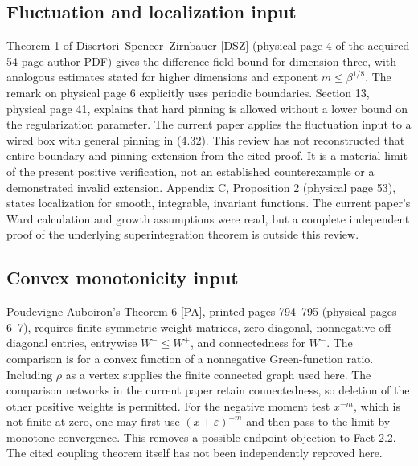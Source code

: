 \documentclass[10pt]{article}
\begin{document}
\subsection*{Fluctuation and localization input}
Theorem 1 of Disertori–Spencer–Zirnbauer [DSZ] (physical page 4 of the acquired 54-page author PDF) gives the difference-field bound for dimension three, with analogous estimates stated for higher dimensions and exponent \(m\leq\beta^{1/8}\). The remark on physical page 6 explicitly uses periodic boundaries. Section 13, physical page 41, explains that hard pinning is allowed without a lower bound on the regularization parameter. The current paper applies the fluctuation input to a wired box with general pinning in (4.32). This review has not reconstructed that entire boundary and pinning extension from the cited proof. It is a material limit of the present positive verification, not an established counterexample or a demonstrated invalid extension. Appendix C, Proposition 2 (physical page 53), states localization for smooth, integrable, invariant functions. The current paper’s Ward calculation and growth assumptions were read, but a complete independent proof of the underlying superintegration theorem is outside this review.\par
\subsection*{Convex monotonicity input}
Poudevigne-Auboiron’s Theorem 6 [PA], printed pages 794–795 (physical pages 6–7), requires finite symmetric weight matrices, zero diagonal, nonnegative off-diagonal entries, entrywise \(W^-\leq W^+\), and connectedness for \(W^-\). The comparison is for a convex function of a nonnegative Green-function ratio. Including \(\rho\) as a vertex supplies the finite connected graph used here. The comparison networks in the current paper retain connectedness, so deletion of the other positive weights is permitted. For the negative moment test \(x^{-m}\), which is not finite at zero, one may first use \((x+\varepsilon)^{-m}\) and then pass to the limit by monotone convergence. This removes a possible endpoint objection to Fact 2.2. The cited coupling theorem itself has not been independently reproved here.\par
\end{document}
